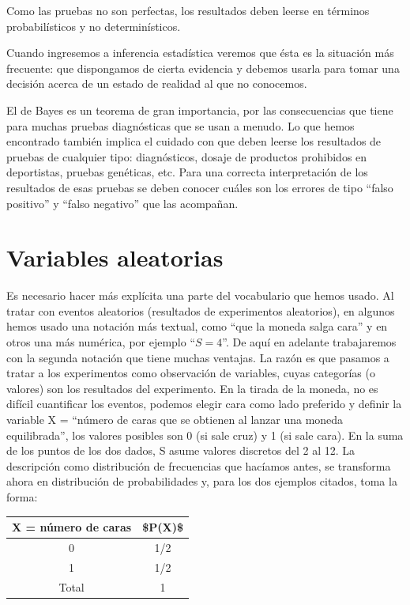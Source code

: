 \documentclass[]{book}
\begin{document}
Como las pruebas no son perfectas, los resultados deben leerse en
términos probabilísticos y no determinísticos.

Cuando ingresemos a inferencia estadística veremos que ésta es la
situación más frecuente: que dispongamos de cierta evidencia y debemos
usarla para tomar una decisión acerca de un estado de realidad al que no conocemos.

El de Bayes es un teorema de gran importancia, por las consecuencias que
tiene para muchas pruebas diagnósticas que se usan a menudo. Lo que
hemos encontrado también implica el cuidado con que deben leerse los
resultados de pruebas de cualquier tipo: diagnósticos, dosaje de
productos prohibidos en deportistas, pruebas genéticas, etc. Para una
correcta interpretación de los resultados de esas pruebas se deben
conocer cuáles son los errores de tipo ``falso positivo'' y ``falso
negativo'' que las acompañan.

\hypertarget{variables-aleatorias}{%
\section{Variables aleatorias}\label{variables-aleatorias}}

Es necesario hacer más explícita una parte del vocabulario que hemos
usado. Al tratar con eventos aleatorios (resultados de experimentos
aleatorios), en algunos hemos usado una notación más textual, como ``que
la moneda salga cara'' y en otros una más numérica, por ejemplo ``\(S=4\)''. De
aquí en adelante trabajaremos con la segunda notación que tiene muchas
ventajas. La razón es que pasamos a tratar a los experimentos como
observación de variables, cuyas categorías (o valores) son los
resultados del experimento. En la tirada de la moneda, no es difícil
cuantificar los eventos, podemos elegir cara como lado preferido y
definir la variable X = ``número de caras que se obtienen al lanzar una
moneda equilibrada'', los valores posibles son 0 (si sale cruz) y 1 (si
sale cara). En la suma de los puntos de los dos dados, S asume valores
discretos del 2 al 12. La descripción como distribución de frecuencias
que hacíamos antes, se transforma ahora en distribución de
probabilidades y, para los dos ejemplos citados, toma la forma:

\begin{table}[H]
\centering
\begin{tabular}{cc}
\toprule
X = número de caras & \$P(X)\$\\
\midrule
\rowcolor{gray!6}  0 & 1/2\\
1 & 1/2\\
\rowcolor{gray!6}  Total & 1\\
\bottomrule
\end{tabular}
\end{table}
\end{document}
